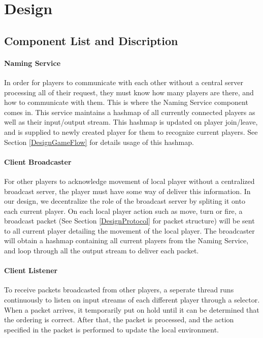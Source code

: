 \section{Design}\label{Design}

\subsection{Component List and Discription}\label{DesignComponent}

\paragraph*{Naming Service}

In order for players to communicate with each other without a central server processing all of their request, they must know how many players are there, and how to communicate with them. This is where the Naming Service component comes in. This service maintains a hashmap of all currently connected players as well as their input/output stream. This hashmap is updated on player join/leave, and is supplied to newly created player for them to recognize current players. See Section \ref{DesignGameFlow} for details usage of this hashmap.

\paragraph*{Client Broadcaster}

For other players to acknowledge movement of local player without a centralized broadcast server, the player must have some way of deliver this information. In our design, we decentralize the role of the broadcast server by spliting it onto each current player. On each local player action such as move, turn or fire, a broadcast packet (See Section \ref{DesignProtocol} for packet structure) will be sent to all current player detailing the movement of the local player. The broadcaster will obtain a hashmap containing all current players from the Naming Service, and loop through all the output stream to deliver each packet.

\paragraph*{Client Listener}

To receive packets broadcasted from other players, a seperate thread runs continuously to listen on input streams of each different player through a selector. When a packet arrives, it temporarily put on hold until it can be determined that the ordering is correct. After that, the packet is processed, and the action specified in the packet is performed to update the local environment.

